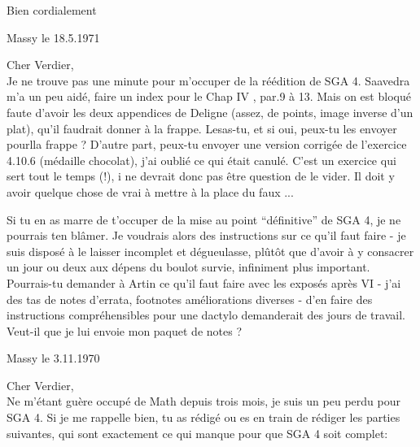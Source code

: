 Bien cordialement\\

\begin{flushright}
Massy le 18.5.1971\\
\end{flushright}
Cher Verdier,\\

Je ne trouve pas une minute pour m'occuper de la réédition de SGA 4. Saavedra m'a un peu aidé,  faire un index pour le Chap IV , par.9 à 13. Mais on est bloqué faute d'avoir les deux appendices de Deligne (assez, de points, image inverse d'un plat), qu'il faudrait donner à la frappe. Lesas-tu, et si oui, peux-tu les envoyer pourlla frappe ? D'autre part, peux-tu envoyer une version corrigée de l'exercice 4.10.6 (médaille chocolat), j'ai  oublié ce qui était canulé. C'est un exercice qui sert tout le temps (!), i ne devrait donc pas être question de le vider. Il doit y avoir quelque chose de vrai à mettre à la place du faux ...

Si tu en as marre de t'occuper de la mise au point ``définitive'' de SGA 4, je ne pourrais ten blâmer. Je voudrais alors des instructions sur ce qu'il faut faire - je suis disposé à le laisser incomplet et dégueulasse, plûtôt que d'avoir à  y consacrer un jour ou deux aux dépens du boulot survie, infiniment plus important. Pourrais-tu demander à Artin ce qu'il faut faire avec les exposés après VI - j'ai des tas de notes d'errata, footnotes améliorations diverses - d'en faire des instructions compréhensibles pour une dactylo demanderait des jours de travail. Veut-il que je lui envoie mon paquet de notes ?

\begin{flushright}
Massy le 3.11.1970\\
\end{flushright}
Cher Verdier,\\

Ne m'étant guère occupé de Math depuis trois mois, je suis un peu perdu pour SGA 4. Si je me rappelle bien, tu as rédigé ou es en train de rédiger les parties suivantes, qui sont exactement ce qui manque pour que SGA 4 soit complet:

